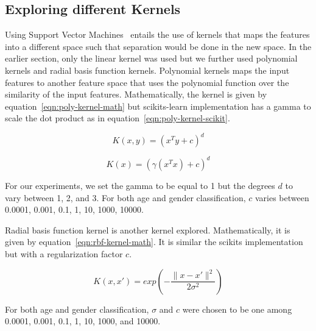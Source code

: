 \documentclass[a4paper]{llncs}
\begin{document}
\subsection{Exploring different Kernels}
Using Support Vector Machines~\cite{cortes1995support} entails the use of kernels that maps the features into a different space such that separation would be done in the new space. In the earlier section, only the linear kernel was used but we further used polynomial kernels and radial basis function kernels. Polynomial kernels maps the input features to another feature space that uses the polynomial function over the similarity of the input features. Mathematically, the kernel is given by equation~\ref{eqn:poly-kernel-math} but scikits-learn implementation has a gamma to scale the dot product as in equation~\ref{eqn:poly-kernel-scikit}.

\begin{equation}
K(x,y) = (x^Ty + c)^d
\label{eqn:poly-kernel-math}
\end{equation}

\begin{equation}
K(x) = (\gamma(x^Tx)+c)^d
\label{eqn:poly-kernel-scikit}
\end{equation}

For our experiments, we set the gamma to be equal to 1 but the degrees $d$ to vary between 1, 2, and 3. For both age and gender classification, $c$ varies between 0.0001, 0.001, 0.1, 1, 10, 1000, 10000.   

Radial basis function kernel is another kernel explored. Mathematically, it is given by equation~\ref{eqn:rbf-kernel-math}. It is similar the scikits implementation but with a regularization factor $c$. 

\begin{equation}
K(x,x')= exp\left( -\frac{\parallel x-x'\parallel^2}{2\sigma^2} \right)
\label{eqn:rbf-kernel-math}
\end{equation} 

For both age and gender classification, $\sigma$ and $c$ were chosen to be one among 0.0001, 0.001, 0.1, 1, 10, 1000, and 10000.
\end{document}
